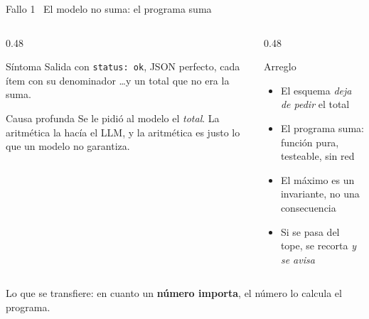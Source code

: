 \documentclass[aspectratio=169,11pt]{beamer}
\begin{document}
\begin{frame}{Fallo 1 \textbullet\ El modelo no suma: el programa suma}
  \begin{columns}[T]
    \begin{column}{0.48\textwidth}
      \begin{alertblock}{Síntoma}
        Salida con \texttt{status: ok}, JSON perfecto, cada ítem con su
        denominador \ldots y un total que no era la suma.
      \end{alertblock}
      \begin{block}{Causa profunda}
        Se le pidió al modelo el \emph{total}. La aritmética la hacía el LLM, y
        la aritmética es justo lo que un modelo no garantiza.
      \end{block}
    \end{column}
    \begin{column}{0.48\textwidth}
      \begin{exampleblock}{Arreglo}
        \begin{itemize}
          \item El esquema \emph{deja de pedir} el total
          \item El programa suma: función pura, testeable, sin red
          \item El máximo es un invariante, no una consecuencia
          \item Si se pasa del tope, se recorta \emph{y se avisa}
        \end{itemize}
      \end{exampleblock}
    \end{column}
  \end{columns}
  \begin{panelRegla}
    Lo que se transfiere: en cuanto un \textbf{número importa}, el número lo
    calcula el programa.
  \end{panelRegla}
\end{frame}
\end{document}
